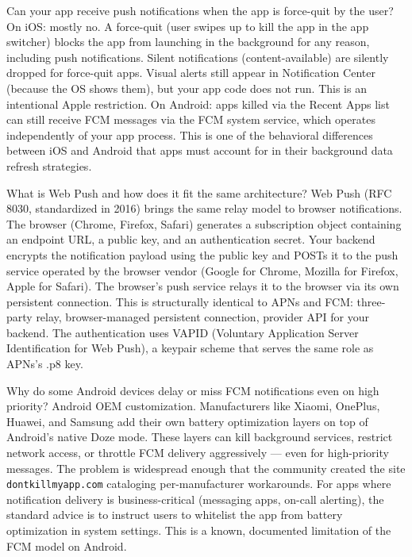 \documentclass[11pt,a4paper]{article}
\begin{document}
\begin{curiobox}{Can your app receive push notifications when the app is force-quit by the user?}
On iOS: mostly no. A force-quit (user swipes up to kill the app in the app switcher) blocks the app from launching in the background for any reason, including push notifications. Silent notifications (content-available) are silently dropped for force-quit apps. Visual alerts still appear in Notification Center (because the OS shows them), but your app code does not run. This is an intentional Apple restriction. On Android: apps killed via the Recent Apps list can still receive FCM messages via the FCM system service, which operates independently of your app process. This is one of the behavioral differences between iOS and Android that apps must account for in their background data refresh strategies.
\end{curiobox}

\begin{curiobox}{What is Web Push and how does it fit the same architecture?}
Web Push (RFC 8030, standardized in 2016) brings the same relay model to browser notifications. The browser (Chrome, Firefox, Safari) generates a subscription object containing an endpoint URL, a public key, and an authentication secret. Your backend encrypts the notification payload using the public key and POSTs it to the push service operated by the browser vendor (Google for Chrome, Mozilla for Firefox, Apple for Safari). The browser's push service relays it to the browser via its own persistent connection. This is structurally identical to APNs and FCM: three-party relay, browser-managed persistent connection, provider API for your backend. The authentication uses VAPID (Voluntary Application Server Identification for Web Push), a keypair scheme that serves the same role as APNs's .p8 key.
\end{curiobox}

\begin{curiobox}{Why do some Android devices delay or miss FCM notifications even on high priority?}
Android OEM customization. Manufacturers like Xiaomi, OnePlus, Huawei, and Samsung add their own battery optimization layers on top of Android's native Doze mode. These layers can kill background services, restrict network access, or throttle FCM delivery aggressively --- even for high-priority messages. The problem is widespread enough that the community created the site \texttt{dontkillmyapp.com} cataloging per-manufacturer workarounds. For apps where notification delivery is business-critical (messaging apps, on-call alerting), the standard advice is to instruct users to whitelist the app from battery optimization in system settings. This is a known, documented limitation of the FCM model on Android.
\end{curiobox}
\end{document}
